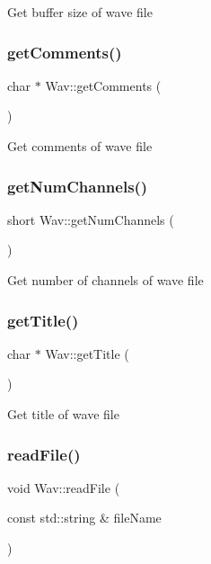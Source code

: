 Get buffer size of wave file \mbox{\label{classWav_a753e2b96322fe7789fb7c54adc0f3884}} 
\subsubsection{\texorpdfstring{get\+Comments()}{getComments()}}
{\footnotesize\ttfamily char $\ast$ Wav\+::get\+Comments (\begin{DoxyParamCaption}{ }\end{DoxyParamCaption})}

Get comments of wave file \mbox{\label{classWav_a5450e63d090ea1d41aced0ccf4c60f36}} 
\subsubsection{\texorpdfstring{get\+Num\+Channels()}{getNumChannels()}}
{\footnotesize\ttfamily short Wav\+::get\+Num\+Channels (\begin{DoxyParamCaption}{ }\end{DoxyParamCaption})}

Get number of channels of wave file \mbox{\label{classWav_a7df708b3c8f91b9fb3ddc60a681a7f4f}} 
\subsubsection{\texorpdfstring{get\+Title()}{getTitle()}}
{\footnotesize\ttfamily char $\ast$ Wav\+::get\+Title (\begin{DoxyParamCaption}{ }\end{DoxyParamCaption})}

Get title of wave file \mbox{\label{classWav_a1c4230cec49d30147a5b8a1950083f7c}} 
\subsubsection{\texorpdfstring{read\+File()}{readFile()}}
{\footnotesize\ttfamily void Wav\+::read\+File (\begin{DoxyParamCaption}\item[{const std\+::string \&}]{file\+Name }\end{DoxyParamCaption})}

